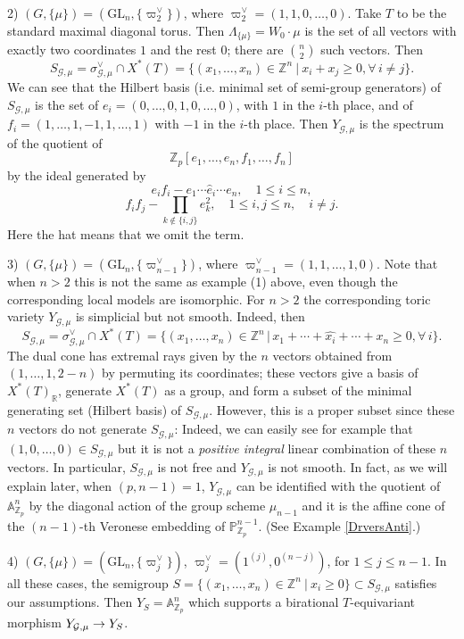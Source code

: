\documentclass[reqno, 10pt]{amsart}
\makeatletter
\newcommand{\BA}{\ensuremath{\mathbb {A}}\xspace}
\newcommand{\BP}{\ensuremath{\mathbb {P}}\xspace}
\newcommand{\BR}{\ensuremath{\mathbb {R}}\xspace}
\newcommand{\BZ}{\ensuremath{\mathbb {Z}}\xspace}
\newcommand{\CG}{\ensuremath{\mathcal {G}}\xspace}
\newcommand{\GL}{\mathrm{GL}}
\newcommand{\wh}{\widehat}
\theoremstyle{definition}
\numberwithin{equation}{subsection}
\numberwithin{subsubsection}{subsection}
\renewcommand{\to}{%
   \ifbool{@display}{\longrightarrow}{\rightarrow}%
   }
\makeatother
\begin{document}
  
 2) $(G,\{\mu\})=(\GL_n, \{\varpi_2^\vee\})$, where $\varpi^\vee_2=(1,1, 0,\ldots, 0)$. Take $T$ to be the standard maximal diagonal torus. Then $\Lambda_{\{\mu\}}=W_0\cdot \mu$ is the set of all vectors with exactly two coordinates $1$ and the rest $0$; there are $n\choose 2$ such vectors. Then
 \[
S_{\CG,\mu}= \sigma^\vee_{\CG,\mu}\cap X^*(T)=\{(x_1,\ldots, x_n)\in \BZ^n\ |\ x_i+x_j\geq 0, \forall\, i\neq j\}.
 \]
 We can see that the Hilbert basis (i.e. minimal set of semi-group generators)  of $S_{\CG,\mu}$ 
 is the set of $e_i=(0,\ldots,0,1,0,\ldots, 0)$, with $1$ in the $i$-th place, and of $f_i=(1,\ldots, 1, -1,1,\ldots, 1)$ with $-1$ in the $i$-th place.
 Then $Y_{\CG,\mu}$ is the spectrum of the quotient of
 \[
 \BZ_p[e_1,\ldots, e_n, f_1,\ldots, f_n]
 \]
 by the ideal generated by 
 \[
 e_if_i-e_1\cdots \wh e_i \cdots e_n,\quad 1\leq i\leq n,
 \]
 \[
  f_if_j-\prod_{k\not\in \{i,j\} }e_k^2, \quad 1\leq i, j\leq n, \quad i\neq j.
 \]
Here the hat means that we omit the term.
\smallskip

3) $(G,\{\mu\})=(\GL_n, \{\varpi_{n-1}^\vee\})$,  where $\varpi^\vee_{n-1}=(1,1,\ldots, 1, 0)$.
Note that when $n>2$ this is not the same as example (1) above, even though the corresponding local models are isomorphic.  For $n>2$ the corresponding toric variety $Y_{\CG,\mu}$ is simplicial but not smooth. 
Indeed, then
 \[
S_{\CG,\mu}= \sigma^\vee_{\CG,\mu}\cap X^*(T)=\{(x_1,\ldots, x_n)\in \BZ^n\, |\, x_1+\cdots +\widehat{x_i}+\cdots +x_n\geq 0, \forall\, i\}.
 \]
 The dual cone has extremal rays given by the $n$ vectors obtained from $(1,\ldots,1, 2-n)$ by permuting its coordinates; these vectors give a basis of $X^*(T)_\BR$, generate $X^*(T)$ as a group, and form a subset of the minimal generating set (Hilbert basis) of $S_{\CG,\mu}$. However, this is a proper subset since these $n$ vectors do not generate $S_{\CG,\mu}$: Indeed, we can easily see for example that $(1,0,\ldots , 0)\in S_{\CG, \mu}$ but it is not a {\sl positive integral} linear combination of these $n$ vectors. In particular, $S_{\CG,\mu}$ is not free and $Y_{\CG,\mu}$ is not smooth. 
In fact, as we will explain later, when $(p, n-1)=1$, $Y_{\CG,\mu}$ can be identified with the quotient of $\BA^n_{\BZ_p}$ by the diagonal action of the group scheme $\mu_{n-1}$ and it is the affine cone of the $(n-1)$-th Veronese embedding of $\BP^{n-1}_{\BZ_p}$.
 (See Example \ref{DrversAnti}.)
\smallskip


4) $(G, \{\mu\})=(\GL_n, \{\varpi_j^\vee\})$, $ \varpi_j^\vee=(1^{(j)}, 0^{(n-j)})$, for $1\leq j\leq n-1$. 
 In all these cases, the  semigroup $S=\{(x_1,\ldots, x_n)\in \BZ^n\ |\ x_i\geq 0\}\subset S_{\CG,\mu}$ satisfies our assumptions. Then $Y_S=\BA^n_{\BZ_p}$ which supports a 
 birational $T$-equivariant morphism $Y_{\CG,\mu}\to Y_S$. 
\smallskip
 
\end{document}

